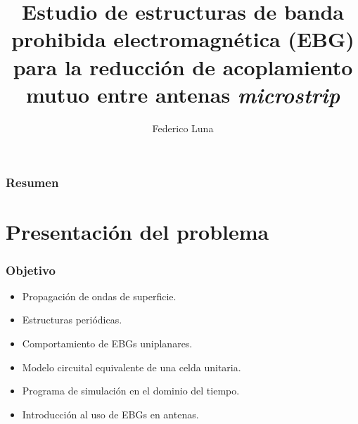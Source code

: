 \documentclass{beamer}
\title[Tesis de grado]{Estudio de estructuras de banda prohibida electromagnética (EBG) para la reducción de acoplamiento mutuo entre antenas \textit{microstrip}} %
\author{Federico Luna} %
\institute[] %
{
Facultad de Ingeniería,\\
Universidad de Buenos Aires \\ %
\medskip
\textit{fluna@fi.uba.ar}\\
\medskip %
Tutores: Dr. Ing. W. Gustavo Fano y Mg. Ing. Silvina Boggi
}
\date{} %
\begin{document}
	\begin{frame}
		\titlepage %
	\end{frame}

\begin{frame}
\frametitle{Resumen} %
\tableofcontents[hideallsubsections] %
\end{frame}


\section{Presentación del problema} %
		\begin{frame}
			\frametitle{Objetivo}
			
			\begin{itemize}
				\item Propagación de ondas de superficie.
				\item Estructuras periódicas.
				\item Comportamiento de EBGs uniplanares.
				\item Modelo circuital equivalente de una celda unitaria.
				\item Programa de simulación en el dominio del tiempo.
				\item Introducción al uso de EBGs en antenas.
			\end{itemize}
		\end{frame}
	
\end{document}
